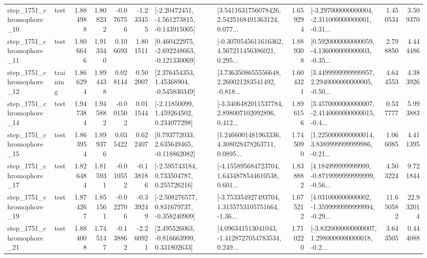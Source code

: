 \begin{tabular}{llrrrrllrlrr}
 step\_1751\_chromophore\_10 &      test &      1.884988 &    1.808232 &     -0.076756 & -1.233455 &   [-2.20472451, -1.561273815, -0.143915005] &  [3.5411631756078426, 2.5425168491363124, 0.077... &       1.659294 &  [-3.297000000000004, -2.311000000000001, -0.31... &            1.450534 &          3.509370 \\
 step\_1751\_chromophore\_11 &      test &      1.806646 &    1.913340 &      0.106693 &  1.801511 &   [0.460422975, -2.692248663, -0.121330069] &  [-0.3070545611616362, 4.567211456386021, 0.295... &       1.889308 &  [0.5920000000000059, -4.136000000000003, -0.35... &            2.798850 &          4.444486 \\
 step\_1751\_chromophore\_12 &  training &      1.866294 &    1.894438 &      0.028144 &  0.502007 &     [2.376454353, 1.45368904, -0.545830349] &  [3.7363508655556648, 2.260021283541492, -0.818... &       1.604321 &  [3.4499999999999957, 2.2940000000000005, -0.50... &            4.644553 &          4.383926 \\
 step\_1751\_chromophore\_14 &      test &      1.947384 &    1.945882 &     -0.001502 &  0.011544 &     [-2.11850099, 1.459264502, 0.234077298] &  [-3.3406482011537784, 2.898007102092896, 0.412... &       1.896156 &  [3.4570000000000007, -2.4140000000000015, -0.4... &            0.537777 &          5.993883 \\
 step\_1751\_chromophore\_15 &      test &      1.863954 &    1.899376 &      0.035422 &  0.622407 &    [0.793772033, 2.635649465, -0.118862082] &  [1.2466001481963336, 4.308028478263711, 0.0895... &       1.745090 &  [1.2250000000000014, 3.8389999999999986, -0.21... &            1.066085 &          4.411395 \\
 step\_1751\_chromophore\_17 &      test &      1.826484 &    1.815931 &     -0.010552 & -0.138186 &    [-2.595743184, 0.733504787, 0.255726216] &  [-4.155895684723704, 1.6434878544610538, 0.601... &       1.838882 &  [4.184999999999999, -0.8719999999999999, -0.56... &            4.503224 &          9.721844 \\
 step\_1751\_chromophore\_19 &      test &      1.874267 &    1.851561 &     -0.022706 & -0.339249 &   [-2.508276577, 0.831679737, -0.358240909] &  [-3.753354927493704, 1.3155753105751664, -1.36... &       1.675212 &  [4.031000000000002, -1.3599999999999994, -0.29... &           11.650582 &         22.932014 \\
 step\_1751\_chromophore\_21 &      test &      1.884008 &    1.745147 &     -0.138862 & -2.260921 &    [2.495526063, -0.816663999, 0.331802633] &  [4.096341513041043, -1.4128727054783534, 0.249... &       1.710220 &  [-3.8320000000000007, 1.2980000000000018, -0.2... &            3.643505 &          0.444088 \\

\end{tabular}
